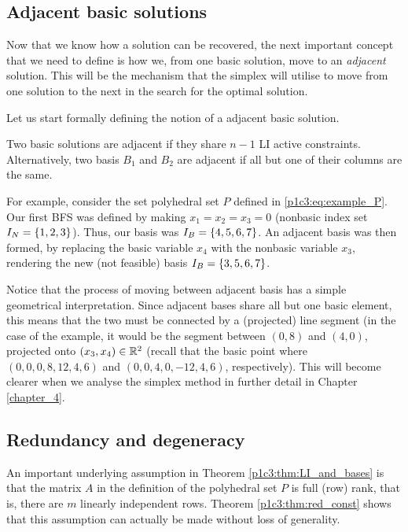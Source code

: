 \subsection{Adjacent basic solutions}

Now that we know how a solution can be recovered, the next important concept that we need to define is how we, from one basic solution, move to an \emph{adjacent} solution. This will be the mechanism that the simplex will utilise to move from one solution to the next in the search for the optimal solution.

Let us start formally defining the notion of a adjacent basic solution.
%
\begin{definition}
	Two basic solutions are adjacent if they share $n-1$ LI active constraints. Alternatively, two basis $B_1$ and $B_2$ are adjacent if all but one of their columns are the same.
\end{definition}
%
For example, consider the set polyhedral set $P$ defined in \eqref{p1c3:eq:example_P}. Our first BFS was defined by making $x_1 = x_2 = x_3 = 0$ (nonbasic index set $I_N = \left\{ 1,2,3 \right \}$). Thus, our basis was $I_B = \left\{ 4,5,6,7 \right \}$. An adjacent basis was then formed, by replacing the basic variable $x_4$ with the nonbasic variable $x_3$, rendering the new (not feasible) basis $I_B = \left\{ 3,5,6,7 \right \}$.

Notice that the process of moving between adjacent basis has a simple geometrical interpretation. Since adjacent bases share all but one basic element, this means that the two must be connected by a (projected) line segment (in the case of the example, it would be the segment between $(0,8)$ and $(4,0)$, projected onto $(x_3,x_4) \in \mathbb{R}^2$ (recall that the basic point where $(0,0,0,8,12,4,6)$ and $(0,0,4,0,-12,4,6)$, respectively). This will become clearer when we analyse the simplex method in further detail in Chapter \ref{chapter_4}. 



\subsection{Redundancy and degeneracy}

An important underlying assumption in Theorem \ref{p1c3:thm:LI_and_bases} is that the matrix $A$ in the definition of the polyhedral set $P$ is full (row) rank, that is, there are $m$ linearly independent rows. Theorem \ref{p1c3:thm:red_const} shows that this assumption can actually be made without loss of generality. 
 
